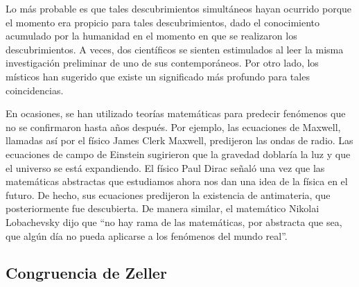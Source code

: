 \documentclass{article}
\begin{document}
Lo m\'as probable es que tales descubrimientos simult\'aneos hayan ocurrido
porque el momento era propicio para tales descubrimientos, dado el conocimiento
acumulado por la humanidad en el momento en que se realizaron los
descubrimientos. A veces, dos cient\'ificos se sienten estimulados al leer la
misma investigaci\'on preliminar de uno de sus contempor\'aneos. Por otro lado,
los m\'isticos han sugerido que existe un significado m\'as profundo para tales
coincidencias.

En ocasiones, se han utilizado teor\'ias matem\'aticas para predecir fen\'omenos
que no se confirmaron hasta a\~nos despu\'es. Por ejemplo, las ecuaciones de
Maxwell, llamadas as\'i por el f\'isico James Clerk Maxwell, predijeron las
ondas de radio. Las ecuaciones de campo de Einstein sugirieron que la gravedad
doblar\'ia la luz y que el universo se est\'a expandiendo. El f\'isico Paul
Dirac se\~nal\'o una vez que las matem\'aticas abstractas que estudiamos ahora
nos dan una idea de la f\'isica en el futuro. De hecho, sus ecuaciones
predijeron la existencia de antimateria, que posteriormente fue descubierta. De
manera similar, el matem\'atico Nikolai Lobachevsky dijo que “no hay rama de las
matem\'aticas, por abstracta que sea, que alg\'un d\'ia no pueda aplicarse a los
fen\'omenos del mundo real”.


\subsection{Congruencia de Zeller}








\pagebreak
 

\end{document}
